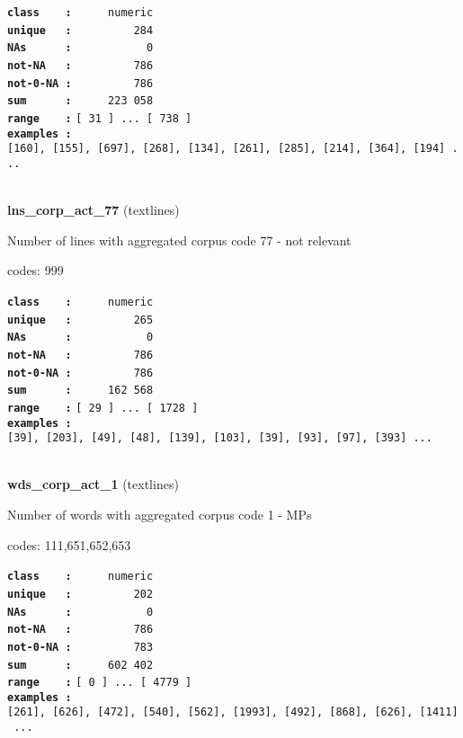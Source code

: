 \documentclass[]{article}
\begin{document}
\textbf{\texttt{class\ \ \ \ :}} \texttt{~~~~~numeric}\\
\textbf{\texttt{unique\ \ \ :}} \texttt{~~~~~~~~~284}\\
\textbf{\texttt{NAs\ \ \ \ \ \ :}} \texttt{~~~~~~~~~~~0}\\
\textbf{\texttt{not-NA\ \ \ :}} \texttt{~~~~~~~~~786}\\
\textbf{\texttt{not-0-NA\ :}} \texttt{~~~~~~~~~786}\\
\textbf{\texttt{sum\ \ \ \ \ \ :}} \texttt{~~~~~223~058}\\
\textbf{\texttt{range\ \ \ \ :}}
\texttt{{[}\ 31\ {]}\ ...\ {[}\ 738\ {]}}\\
\textbf{\texttt{examples\ :}}
\texttt{{[}160{]},\ {[}155{]},\ {[}697{]},\ {[}268{]},\ {[}134{]},\ {[}261{]},\ {[}285{]},\ {[}214{]},\ {[}364{]},\ {[}194{]}\ ...}\\

~

\textbf{lns\_corp\_act\_77} (textlines)

Number of lines with aggregated corpus code 77 - not relevant

codes: 999

\textbf{\texttt{class\ \ \ \ :}} \texttt{~~~~~numeric}\\
\textbf{\texttt{unique\ \ \ :}} \texttt{~~~~~~~~~265}\\
\textbf{\texttt{NAs\ \ \ \ \ \ :}} \texttt{~~~~~~~~~~~0}\\
\textbf{\texttt{not-NA\ \ \ :}} \texttt{~~~~~~~~~786}\\
\textbf{\texttt{not-0-NA\ :}} \texttt{~~~~~~~~~786}\\
\textbf{\texttt{sum\ \ \ \ \ \ :}} \texttt{~~~~~162~568}\\
\textbf{\texttt{range\ \ \ \ :}}
\texttt{{[}\ 29\ {]}\ ...\ {[}\ 1728\ {]}}\\
\textbf{\texttt{examples\ :}}
\texttt{{[}39{]},\ {[}203{]},\ {[}49{]},\ {[}48{]},\ {[}139{]},\ {[}103{]},\ {[}39{]},\ {[}93{]},\ {[}97{]},\ {[}393{]}\ ...}\\

~

\textbf{wds\_corp\_act\_1} (textlines)

Number of words with aggregated corpus code 1 - MPs

codes: 111,651,652,653

\textbf{\texttt{class\ \ \ \ :}} \texttt{~~~~~numeric}\\
\textbf{\texttt{unique\ \ \ :}} \texttt{~~~~~~~~~202}\\
\textbf{\texttt{NAs\ \ \ \ \ \ :}} \texttt{~~~~~~~~~~~0}\\
\textbf{\texttt{not-NA\ \ \ :}} \texttt{~~~~~~~~~786}\\
\textbf{\texttt{not-0-NA\ :}} \texttt{~~~~~~~~~783}\\
\textbf{\texttt{sum\ \ \ \ \ \ :}} \texttt{~~~~~602~402}\\
\textbf{\texttt{range\ \ \ \ :}}
\texttt{{[}\ 0\ {]}\ ...\ {[}\ 4779\ {]}}\\
\textbf{\texttt{examples\ :}}
\texttt{{[}261{]},\ {[}626{]},\ {[}472{]},\ {[}540{]},\ {[}562{]},\ {[}1993{]},\ {[}492{]},\ {[}868{]},\ {[}626{]},\ {[}1411{]}\ ...}\\
\end{document}
